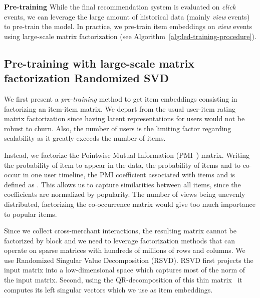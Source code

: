 \documentclass[sigconf]{acmart}
\begin{document}
\textbf{Pre-training} While the final recommendation system is evaluated on \emph{click} events, we can leverage the large amount of historical data (mainly \emph{view} events) to pre-train the model. In practice, we pre-train item embeddings  on \emph{view} events using large-scale matrix factorization (see Algorithm~\ref{alg:led-training-procedure}). 

\subsection{Pre-training with large-scale matrix factorization Randomized SVD}
\label{subsec:matrix-fatorization-with-randomized-svd}

We first present a \emph{pre-training} method to get item embeddings consisting in factorizing an item-item matrix. We depart from the usual user-item rating matrix factorization since having latent representations for users would not be robust to churn. Also, the number of users is the limiting factor regarding scalability as it greatly exceeds the number of items.

Instead, we factorize the Pointwise Mutual Information (PMI~\cite{pmi-bouma-2009}) matrix.  Writing  the probability of item  to appear in the data,  the probability of items  and  to co-occur in one user timeline, the PMI coefficient associated with items  and  is defined as . This allows us to capture similarities between all items, since the coefficients are normalized by popularity. The number of views being unevenly distributed, factorizing the co-occurrence matrix would give too much importance to popular items. 











Since we collect cross-merchant interactions, the resulting matrix cannot be factorized by block and we need to leverage factorization methods that can operate on sparse matrices with hundreds of millions of rows and columns. We use Randomized Singular Value Decomposition (RSVD). RSVD first projects the input matrix into a low-dimensional space which captures most of the norm of the input matrix. Second, using the QR-decomposition of this thin matrix~\cite{constantine-2011} it computes its left singular vectors which we use as item embeddings. 
\end{document}
